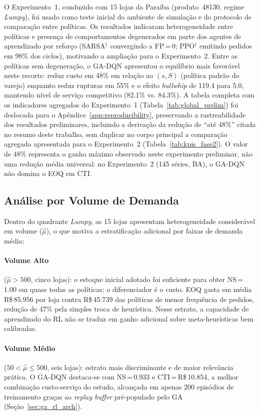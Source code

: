 O Experimento~1, conduzido com 15 lojas da Paraíba (produto~48130, regime \textit{Lumpy}), foi usado como teste inicial do ambiente de simulação e do protocolo de comparação entre políticas. Os resultados indicaram heterogeneidade entre políticas e presença de comportamentos degenerados em parte dos agentes de aprendizado por reforço (SARSA$^\dagger$ convergindo a FP\,=\,$0$; PPO$^\dagger$ emitindo pedidos em 98\% dos ciclos), motivando a ampliação para o Experimento~2. Entre as políticas sem degeneração, o GA-DQN apresentou o equilíbrio mais favorável neste recorte: reduz custo em 48\% em relação ao $(s,S)$ (política padrão do varejo) enquanto reduz rupturas em 55\% e o efeito \textit{bullwhip} de 119.4 para 5.0, mantendo nível de serviço competitivo (82.1\% vs. 84.3\%). A tabela completa com os indicadores agregados do Experimento~1 (Tabela~\ref{tab:global_prelim}) foi deslocada para o Apêndice~\ref{app:reproducibility}, preservando a rastreabilidade dos resultados preliminares, incluindo a derivação da redução de ``até 48\%'' citada no resumo deste trabalho, sem duplicar no corpo principal a comparação agregada apresentada para o Experimento~2 (Tabela~\ref{tab:kpis_fase2}). O valor de 48\% representa o ganho máximo observado neste experimento preliminar, não uma redução média universal: no Experimento~2 (145 séries, BA), o GA-DQN não domina o EOQ em CTI.

\subsection{Análise por Volume de Demanda}

Dentro do quadrante \textit{Lumpy}, as 15 lojas apresentam heterogeneidade considerável em volume ($\hat{\mu}$), o que motiva a estratificação adicional por faixas de demanda média:

\paragraph{Volume Alto} ($\hat{\mu}>500$, cinco lojas): o estoque inicial adotado foi suficiente para obter NS\,=\,$1.00$ em quase todas as políticas; o diferenciador é o custo. EOQ gasta em média R\$\,85.956 por loja contra R\$\,45.739 das políticas de menor frequência de pedidos, redução de 47\% pela simples troca de heurística. Nesse estrato, a capacidade de aprendizado do RL não se traduz em ganho adicional sobre meta-heurísticas bem calibradas.

\paragraph{Volume Médio} ($50 < \hat{\mu} \leq 500$, seis lojas): estrato mais discriminante e de maior relevância prática. O GA-DQN destaca-se com NS\,=\,$0.933$ e CTI\,=\,R\$\,10.854, a melhor combinação custo-serviço do estudo, alcançada em apenas 200 episódios de treinamento graças ao \textit{replay buffer} pré-populado pelo GA (Seção~\ref{sec:ga_rl_arch}).

